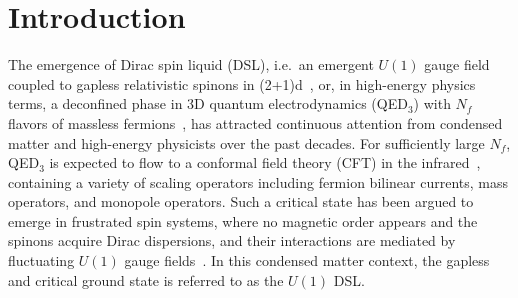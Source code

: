 \documentclass[aps,prl,twocolumn,superscriptaddress,showpacs,longbibliography]{revtex4-2}
\begin{document}
\date{\today}
\maketitle



\section*{Introduction}

The emergence of Dirac spin liquid (DSL), i.e.\ an emergent $U(1)$ gauge field coupled to gapless relativistic spinons in (2+1)d~\cite{Hermele2004,Assaad2005,Hermele2005,ranProjected2007,ranSpontaneous2009,XYXuU12018,wangDynamics2019,LuoTwistedDSL22,WietekQED3,SeifertSpinPeierls24,janssenConfinement2020}, or, in high-energy physics terms, a deconfined phase in 3D quantum electrodynamics (QED$_3$) with $N_f$ flavors of massless fermions~\cite{Fiebig1990,Herbut2003,Fiore2005,Armour2011,chester2016towards,di2017scaling,karthikNumerical2019,Albayrak2022}, has attracted continuous attention from condensed matter and high-energy physicists over the past decades. For sufficiently large $N_f$, QED$_3$ is expected to flow to a conformal field theory (CFT) in the infrared~\cite{karthikNumerical2019,chester2016towards}, containing a variety of scaling operators including fermion bilinear currents, mass operators, and monopole operators. Such a critical state has been argued to emerge in frustrated spin systems, where no magnetic order appears and the spinons acquire Dirac dispersions, and their interactions are mediated by fluctuating $U(1)$ gauge fields~\cite{Hastings2003,Hermele2004,Assaad2005,Hermele2005,ranProjected2007,ranSpontaneous2009,Iqbal2011,Imada2014,White2015,Hu2015,Iqbal2016,He2017,Gong2017,Saadamand2017,XYXuU12018,wangDynamics2019,song19,He2019,Ferrari2019,nomuraDirac2021,LuoTwistedDSL22,WietekQED3,SeifertSpinPeierls24,Sherman2023,Drescher2023,janssenConfinement2020}. In this condensed matter context, the gapless and critical ground state is referred to as the $U(1)$ DSL.
\end{document}
